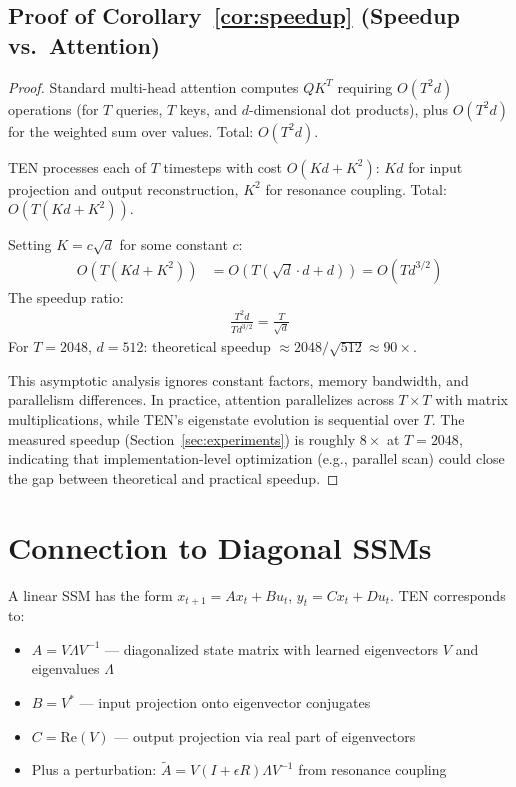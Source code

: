 \documentclass{article}
\begin{document}
\subsection{Proof of Corollary~\ref{cor:speedup} (Speedup vs.\ Attention)}

\begin{proof}
Standard multi-head attention computes $QK^T$ requiring $O(T^2 d)$ operations (for $T$ queries, $T$ keys, and $d$-dimensional dot products), plus $O(T^2 d)$ for the weighted sum over values. Total: $O(T^2 d)$.

TEN processes each of $T$ timesteps with cost $O(Kd + K^2)$: $Kd$ for input projection and output reconstruction, $K^2$ for resonance coupling. Total: $O(T(Kd + K^2))$.

Setting $K = c\sqrt{d}$ for some constant $c$:
\begin{align}
O(T(Kd + K^2)) &= O(T(\sqrt{d} \cdot d + d)) = O(Td^{3/2})
\end{align}
The speedup ratio:
\begin{align}
\frac{T^2 d}{T d^{3/2}} = \frac{T}{\sqrt{d}}
\end{align}
For $T = 2048$, $d = 512$: theoretical speedup $\approx 2048/\sqrt{512} \approx 90\times$.

This asymptotic analysis ignores constant factors, memory bandwidth, and parallelism differences. In practice, attention parallelizes across $T \times T$ with matrix multiplications, while TEN's eigenstate evolution is sequential over $T$. The measured speedup (Section~\ref{sec:experiments}) is roughly $8\times$ at $T = 2048$, indicating that implementation-level optimization (e.g., parallel scan) could close the gap between theoretical and practical speedup.
\end{proof}


\section{Connection to Diagonal SSMs}
\label{app:ssm}

A linear SSM has the form $x_{t+1} = Ax_t + Bu_t$, $y_t = Cx_t + Du_t$. TEN corresponds to:
\begin{itemize}
\item $A = V \Lambda V^{-1}$ — diagonalized state matrix with learned eigenvectors $V$ and eigenvalues $\Lambda$
\item $B = V^*$ — input projection onto eigenvector conjugates
\item $C = \text{Re}(V)$ — output projection via real part of eigenvectors
\item Plus a perturbation: $\tilde{A} = V(I + \epsilon R)\Lambda V^{-1}$ from resonance coupling
\end{itemize}
\end{document}
